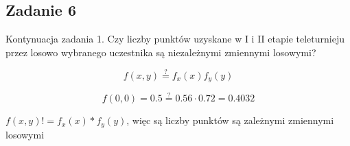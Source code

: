 \subsection{Zadanie 6}

Kontynuacja zadania 1.
Czy liczby punktów uzyskane w I i II etapie teleturnieju przez losowo wybranego uczestnika są niezależnymi zmiennymi losowymi?

$$f(x,y) \stackrel{?}{=} f_x(x)f_y(y)$$

$$f(0,0) = 0.5 \stackrel{?}{=} 0.56 \cdot 0.72 = 0.4032$$

$f(x,y) != f_x(x)*f_y(y)$, więc są liczby punktów są zależnymi zmiennymi losowymi
